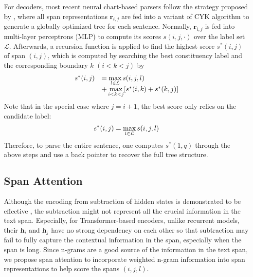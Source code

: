 \documentclass[11pt,a4paper]{article}
\begin{document}
For decoders, most recent neural chart-based parsers follow the strategy proposed by , where all span representations $\mathbf{r}_{i,j}$ are fed into a variant of CYK algorithm to generate a globally optimized tree for each sentence.
Normally, $\mathbf{r}_{i,j}$ is fed into multi-layer perceptrons (MLP) to compute its scores $s(i,j,\cdot)$ over the label set $\mathcal{L}$.
Afterwards, a recursion function is applied to find the highest score $s^{*}(i,j)$ of span $(i,j)$, which is computed by searching the best constituency label and the corresponding boundary $k$ $(i < k < j)$ by
\begin{equation} \label{eq: best (i,j)}
\setlength\abovedisplayskip{5pt}
\setlength\belowdisplayskip{5pt}
    \begin{array}{ll}
        s^{*}(i,j) &= \max\limits_{l \in \mathcal{L}} s(i,j,l) \\
        &+ \max\limits_{i < k < j}[s^{*}(i,k) + s^{*}(k,j)]
    \end{array}
\end{equation}
Note that in the special case where $j=i+1$, the best score only relies on the candidate label:
\begin{align} \label{eq: best (i,i+1)}
\setlength\abovedisplayskip{5pt}
\setlength\belowdisplayskip{5pt}
    s^{*}(i,j) = \max\limits_{l \in \mathcal{L}} s(i,j,l)
\end{align}
Therefore, to parse the entire sentence, one computes $s^*(1, q)$ through the above steps and use a back pointer to recover the full tree structure.


\subsection{Span Attention}

Although the encoding from subtraction of hidden states is demonstrated to be effective \cite{stern-etal-2017-minimal,kitaev-klein-2018-constituency,kitaev-etal-2019-multilingual}, 
the subtraction might not represent all the crucial information in the text span.
Especially, for Transformer-based encoders, unlike recurrent models, their $\mathbf{h}_{i}$ and $\mathbf{h}_{j}$ have no strong dependency on each other so that subtraction may fail to fully capture the contextual information in the span, especially when the span is long.
Since n-grams are a good source of the information in the text span, we propose span attention to incorporate weighted n-gram information into span representations to help score the spans $(i,j,l)$.
\end{document}
